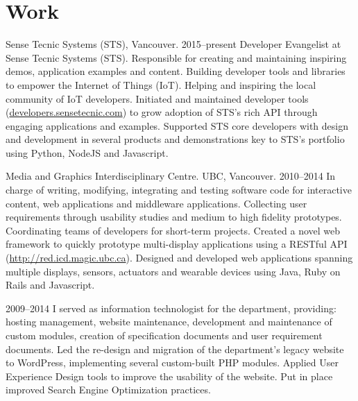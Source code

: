\documentclass[full]{rvca}
\begin{document}
\section{Work}


\workitem
{Sense Tecnic Systems (STS), Vancouver.}%
{2015--present}%
{Developer Evangelist at Sense Tecnic Systems (STS). Responsible for creating and maintaining inspiring demos, application examples and content. Building developer tools and libraries to empower the Internet of Things (IoT). Helping and inspiring the local community of IoT developers.}%
{Initiated and maintained developer tools (\href{http://developers.sensetecnic.com}{developers.sensetecnic.com}) to grow adoption of STS's rich API through engaging applications and examples.}%
{Supported STS core developers with design and development in several products and demonstrations key to STS's portfolio using Python, NodeJS and Javascript.}

\workitem
{Media and Graphics Interdisciplinary Centre. UBC, Vancouver.}%
{2010--2014}%
{In charge of writing, modifying, integrating and testing software code for interactive content, web applications and middleware applications. Collecting user requirements through usability studies and medium to high fidelity prototypes. Coordinating teams of developers for short-term projects.}%
{Created a novel web framework to quickly prototype multi-display applications using a RESTful API (\href{http://red.icd.magic.ubc.ca}{http://red.icd.magic.ubc.ca}).}%
{Designed and developed web applications spanning multiple displays, sensors, actuators and wearable devices using Java, Ruby on Rails and Javascript.}

{2009--2014}
{I served as information technologist for the department, providing: hosting management, website maintenance, development and maintenance of custom modules, creation of specification documents and user requirement documents.}
{Led the re-design and migration of the department's legacy website to WordPress, implementing several custom-built PHP modules.}
{Applied User Experience Design tools to improve the usability of the website. Put in place improved Search Engine Optimization practices.}

\newpage
\end{document}
